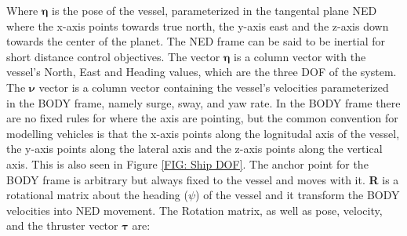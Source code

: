 Where $\bm{\eta}$ is the pose of the vessel, parameterized in the tangental plane \gls{NED} where the x-axis points towards true north, the y-axis east and the z-axis down towards the center of the planet.
The \gls{NED} frame can be said to be inertial for short distance control objectives.
The vector $\bm{\eta}$ is a column vector with the vessel's North, East and Heading values, which are the three \gls{DOF} of the system. The $\bm{\nu}$ vector is a column vector containing
the vessel's velocities parameterized in the BODY frame, namely surge, sway, and yaw rate. In the BODY frame there are no fixed rules for where the axis are pointing, but the common convention for modelling
vehicles is that the x-axis points along the lognitudal axis of the vessel, the y-axis points along the lateral axis and the z-axis points along the vertical axis. This is also seen in Figure \ref{FIG: Ship DOF}.
The anchor point for the BODY frame is arbitrary but always fixed to the vessel and moves with it. \textbf{R} is a rotational matrix about the heading ($\psi$) of the vessel and it transform the BODY velocities into
NED movement. 
The Rotation matrix, as well as pose, velocity, and the thruster vector $\bm{\tau}$ are:

